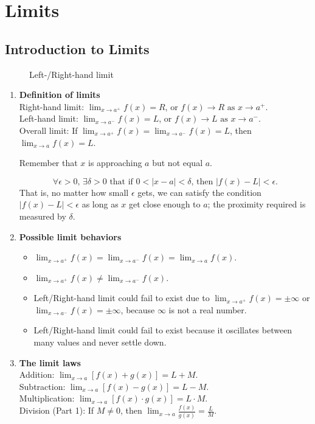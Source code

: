 %
\chapter{Limits}
\section{Introduction to Limits}
\begin{figure}[H]
    \centering
    \caption{Left-/Right-hand limit}
\end{figure}
\begin{enumerate}
    \item \textbf{Definition of limits}\\
        \indent Right-hand limit: \(\lim_{x\to a^+}f(x)=R\), or \(f(x)\to R\text{ as }x\to a^+\).\\
        \indent Left-hand limit: \(\lim_{x\to a^-}f(x)=L\), or \(f(x)\to L\text{ as }x\to a^-\).\\
        \indent Overall limit: If \(\lim_{x\to a^+}f(x)=\lim_{x\to a^-} f(x)=L\), then \(\lim_{x\to a}f(x)=L\).\par
        Remember that \(x\) is approaching \(a\) but not equal \(a\).
        \begin{definition}
            \[
                \forall\epsilon>0,\,\exists\delta>0\text{ that if }0<\lvert x-a\rvert<\delta,\,\text{then }\lvert f(x)-L\rvert<\epsilon.
            \]
            That is, no matter how small \(\epsilon\) gets, we can satisfy the condition \(\lvert f(x)-L\rvert<\epsilon\) as long as \(x\) get close enough to \(a\); the proximity required is measured by \(\delta\).
        \end{definition}
    \item \textbf{Possible limit behaviors}
        \begin{itemize}
            \item \(\lim_{x\to a^+}f(x)=\lim_{x\to a^-}f(x)=\lim_{x\to a}f(x)\).
            \item \(\lim_{x\to a^+}f(x)\neq\lim_{x\to a^-}f(x)\).
            \item Left\slash Right-hand limit could fail to exist due to \(\lim_{x\to a^+}f(x)=\pm\infty\) or \(\lim_{x\to a^-}f(x)=\pm\infty\), because \(\infty\) is not a real number.
            \item Left\slash Right-hand limit could fail to exist because it oscillates between many values and never settle down.
        \end{itemize}
    \item \textbf{The limit laws}\\
        \indent Addition: \(\lim_{x\to a}[f(x)+g(x)]=L+M\).\\
        \indent Subtraction: \(\lim_{x\to a}[f(x)-g(x)]=L-M.\)\\
        \indent Multiplication: \(\lim_{x\to a}[f(x)\cdot g(x)]=L\cdot M\).\\
        \indent Division (Part 1): If \(M\neq 0\), then \(\lim_{x\to a}\frac{f(x)}{g(x)}=\frac{L}{M}\).
\end{enumerate}


